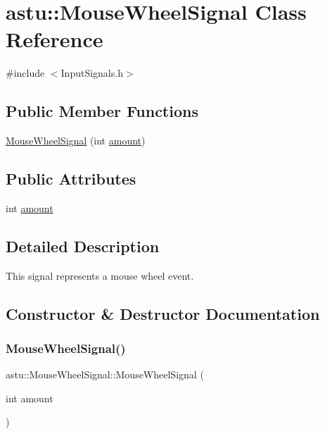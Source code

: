 \hypertarget{classastu_1_1MouseWheelSignal}{}\section{astu\+:\+:Mouse\+Wheel\+Signal Class Reference}
\label{classastu_1_1MouseWheelSignal}


{\ttfamily \#include $<$Input\+Signals.\+h$>$}

\subsection*{Public Member Functions}
\begin{DoxyCompactItemize}
\item 
\hyperlink{classastu_1_1MouseWheelSignal_a0eac628f47fa3898abac8043f7c89e02}{Mouse\+Wheel\+Signal} (int \hyperlink{classastu_1_1MouseWheelSignal_ab53aabb0811ff39dced375ae5755806d}{amount})
\end{DoxyCompactItemize}
\subsection*{Public Attributes}
\begin{DoxyCompactItemize}
\item 
int \hyperlink{classastu_1_1MouseWheelSignal_ab53aabb0811ff39dced375ae5755806d}{amount}
\end{DoxyCompactItemize}


\subsection{Detailed Description}
This signal represents a mouse wheel event. 

\subsection{Constructor \& Destructor Documentation}
\mbox{\label{classastu_1_1MouseWheelSignal_a0eac628f47fa3898abac8043f7c89e02}} 
\subsubsection{\texorpdfstring{Mouse\+Wheel\+Signal()}{MouseWheelSignal()}}
{\footnotesize\ttfamily astu\+::\+Mouse\+Wheel\+Signal\+::\+Mouse\+Wheel\+Signal (\begin{DoxyParamCaption}\item[{int}]{amount }\end{DoxyParamCaption})\hspace{0.3cm}{\ttfamily [inline]}}

